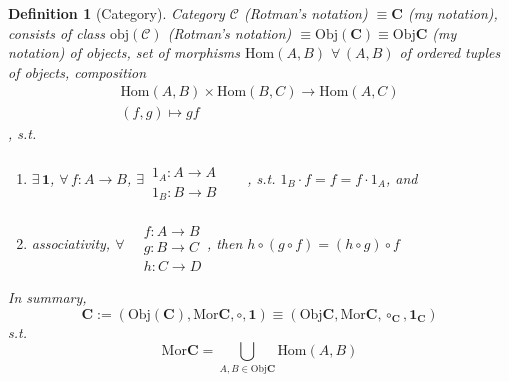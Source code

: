 \documentclass[10pt]{amsart}
\newtheorem{definition}{Definition}
\begin{document}
\begin{multicols*}{2}
\begin{definition}[Category]
Category $\mathcal{C}$ (Rotman's notation) $\equiv \mathbf{C}$ (my notation), consists of class $\text{obj}(\mathcal{C})$ (Rotman's notation) $\equiv \text{Obj}(\mathbf{C}) \equiv \text{Obj}\mathbf{C}$ (my notation) of objects, set of  morphisms $\text{Hom}(A,B)$ $\forall \,  (A,B)$ of ordered tuples of objects, composition 
\[
\begin{gathered} 
	\text{Hom}(A,B)\times \text{Hom}(B ,C) \to \text{Hom}(A,C) \\
(f,g)\mapsto gf \end{gathered}
\], s.t.
\begin{enumerate}
\item $\exists \, \mathbf{1}$, $\forall \, f:A\to B$, $\exists \, \begin{aligned} & \quad \\ 
1_A : A \to A \\
1_B : B \to B \end{aligned}$, s.t. $1_B \cdot f = f= f\cdot 1_A$, and 
\item associativity, $\forall \, \begin{aligned} & \quad \\
& f : A\to B \\
& g: B\to C \\
& h: C\to D \end{aligned}$, then $h\circ (g\circ f) = (h\circ g) \circ f$ 
\end{enumerate}

In summary, 
\begin{equation}
	\mathbf{C} := (\text{Obj}(\mathbf{C}), \text{Mor}\mathbf{C}, \circ, \mathbf{1}) \equiv (\text{Obj}\mathbf{C}, \text{Mor}\mathbf{C}, \circ_{\mathbf{C}}, \mathbf{1}_{\mathbf{C}})
\end{equation}
s.t. 
\[
\text{Mor}\mathbf{C} = \bigcup_{A,B \in \text{Obj}\mathbf{C}} \text{Hom}(A,B)
\]
\end{definition}


\end{multicols*}
\end{document}
